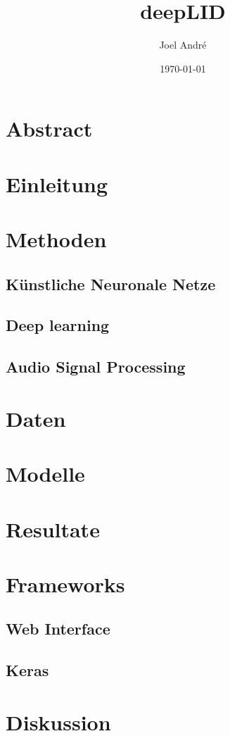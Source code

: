 \documentclass{article}
\title{deepLID}
\author{Joel André}
\date{\today{}}
\begin{document}
	\maketitle
	\newpage
	\tableofcontents
	
	\section{Abstract}
	\section{Einleitung}
	\section{Methoden}
	\subsection{Künstliche Neuronale Netze}
	\subsection{Deep learning}
	\subsection{Audio Signal Processing}
	\section{Daten}
	\section{Modelle}
	\section{Resultate}
	\section{Frameworks}
	\subsection{Web Interface}
	\subsection{Keras}
	\section{Diskussion}
	
	\listoffigures
	
	
\end{document}
